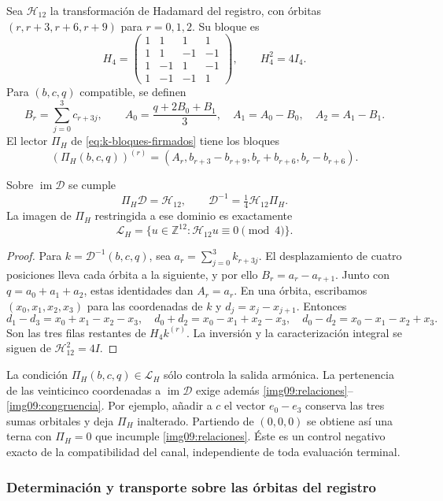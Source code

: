 Sea $\mathcal H_{12}$ la transformación de Hadamard del registro,
con órbitas $(r,r+3,r+6,r+9)$ para $r=0,1,2$. Su bloque es
\[
 H_4=\begin{pmatrix}
 1&1&1&1\\1&1&-1&-1\\1&-1&1&-1\\1&-1&-1&1
 \end{pmatrix},\qquad H_4^2=4I_4.
\]
Para $(b,c,q)$ compatible, se definen
\[
 B_r=\sum_{j=0}^3c_{r+3j},\qquad
 A_0=\frac{q+2B_0+B_1}{3},\quad A_1=A_0-B_0,
 \quad A_2=A_1-B_1.
\]
El lector $\Pi_H$ de \eqref{eq:k-bloques-firmados} tiene los bloques
\[
 (\Pi_H(b,c,q))^{(r)}=
 (A_r,b_{r+3}-b_{r+9},b_r+b_{r+6},b_r-b_{r+6}).
\]

\begin{proposition}
\label{img09:triangulo}
Sobre $\operatorname{im}\mathcal D$ se cumple
\[
 \Pi_H\mathcal D=\mathcal H_{12},\qquad
 \mathcal D^{-1}=\tfrac14\mathcal H_{12}\Pi_H.
\]
La imagen de $\Pi_H$ restringida a ese dominio es exactamente
\[
 \mathcal L_H=
 \{u\in\mathbb Z^{12}:\mathcal H_{12}u\equiv0\pmod4\}.
\]
\end{proposition}
\begin{proof}
Para $k=\mathcal D^{-1}(b,c,q)$, sea
$a_r=\sum_{j=0}^3k_{r+3j}$. El desplazamiento de cuatro posiciones
lleva cada órbita a la siguiente, y por ello $B_r=a_r-a_{r+1}$.
Junto con $q=a_0+a_1+a_2$, estas identidades dan $A_r=a_r$.
En una órbita, escribamos $(x_0,x_1,x_2,x_3)$ para las coordenadas
de $k$ y $d_j=x_j-x_{j+1}$. Entonces
\[
 d_1-d_3=x_0+x_1-x_2-x_3,\quad
 d_0+d_2=x_0-x_1+x_2-x_3,\quad
 d_0-d_2=x_0-x_1-x_2+x_3.
\]
Son las tres filas restantes de $H_4k^{(r)}$. La inversión y la
caracterización integral se siguen de $\mathcal H_{12}^2=4I$.
\end{proof}

La condición $\Pi_H(b,c,q)\in\mathcal L_H$ sólo controla la
salida armónica. La pertenencia de las veinticinco coordenadas a
$\operatorname{im}\mathcal D$ exige además
\eqref{img09:relaciones}--\eqref{img09:congruencia}.
Por ejemplo, añadir a $c$ el vector $e_0-e_3$ conserva las tres sumas
orbitales y deja $\Pi_H$ inalterado. Partiendo de $(0,0,0)$ se
obtiene así una terna con $\Pi_H=0$ que incumple
\eqref{img09:relaciones}. Éste es un control negativo exacto de la
compatibilidad del canal, independiente de toda evaluación terminal.

\subsubsection{Determinación y transporte sobre las órbitas del registro}

